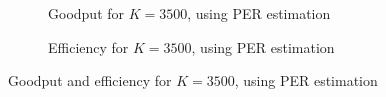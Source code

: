 \begin{figure}[t!]
\centering
\begin{subfigure}{0.23\textwidth}
	\captionsetup{justification=centering,font=scriptsize}
	\setlength\fwidth{\textwidth}
	\setlength{}
	
	\caption{Goodput for $K=3500$, using PER estimation}
	\label{fig:pm1_goodput}
\end{subfigure}\hspace{2em}%
\begin{subfigure}{0.23\textwidth}
	\captionsetup{justification=centering,font=scriptsize}
	\setlength\fwidth{\textwidth}
	\setlength{}
	
	\caption{Efficiency for $K=3500$, using PER estimation}
	\label{fig:pm1_efficiency}
\end{subfigure}
\caption{Goodput and efficiency for $K=3500$, using PER estimation}
\label{fig:pm1}
\end{figure}

